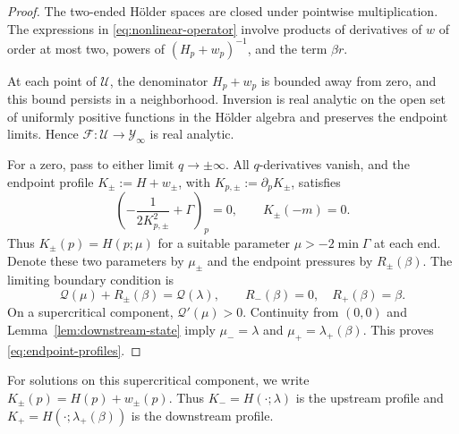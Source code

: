 \documentclass[12pt,letterpaper]{amsart}
\numberwithin{equation}{section}
\begin{document}
\begin{proof}
	{The two-ended H\"older spaces are closed under pointwise multiplication. The expressions in \eqref{eq:nonlinear-operator} involve products of derivatives of $w$ of order at most two, powers of $(H_p+w_p)^{-1}$, and the term $\beta r$.}
	
	{At each point of $\mathscr U$, the denominator $H_p+w_p$ is bounded away from zero, and this bound persists in a neighborhood. Inversion is real analytic on the open set of uniformly positive functions in the H\"older algebra and preserves the endpoint limits. Hence $\mathcal F:\mathscr U\to\mathscr Y_\infty$ is real analytic.}
	
	For a zero, pass to either limit \(q\to\pm\infty\).  All \(q\)-derivatives vanish,
	{and the endpoint profile $K_\pm:=H+w_\pm$, with $K_{p,\pm}:=\partial_pK_\pm$, satisfies}
	\[
	\left(-\frac1{2K_{p,\pm}^2}+\Gamma\right)_p=0,\qquad {K_\pm(-m)=0}.
	\]
	Thus \(K_\pm(p)=H(p;\mu)\) {for a suitable parameter $\mu>-2\min\Gamma$ at each end. Denote these two parameters by $\mu_\pm$ and the endpoint pressures by $R_\pm(\beta)$. The limiting boundary condition is}
	\[
	\mathcal Q(\mu)+R_\pm(\beta)=\mathcal Q(\lambda),
	\qquad R_-(\beta)=0,\quad R_+(\beta)=\beta.
	\]
	On a supercritical component, \(\mathcal Q'(\mu)>0\).  Continuity from \((0,0)\) and
	{Lemma~\ref{lem:downstream-state} imply} \(\mu_-=\lambda\) and
	\(\mu_+=\lambda_+(\beta)\).  This proves \eqref{eq:endpoint-profiles}.
\end{proof}
{For solutions on this supercritical component, we write $K_\pm(p)=H(p)+w_\pm(p)$. Thus $K_-=H(\cdot;\lambda)$ is the upstream profile and $K_+=H(\cdot;\lambda_+(\beta))$ is the downstream profile.}










	
	
	
	
	
	
\end{document}
